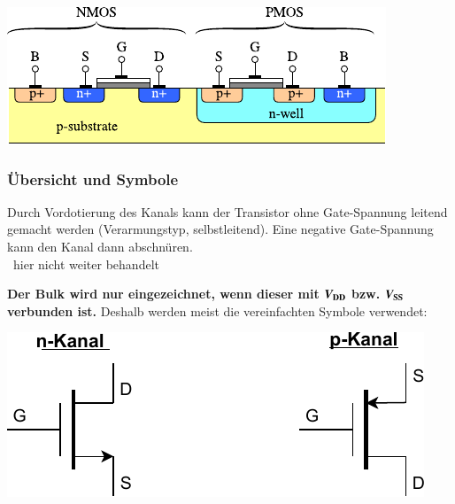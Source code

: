 \vspace{-0.2cm}

\begin{center}
    \includegraphics[width=0.5\columnwidth, align=t]{images/02_CMOS.pdf}
\end{center}


\subsubsection{Übersicht und Symbole}

\begin{minipage}[t]{0.48\columnwidth}
    Durch Vordotierung des Kanals kann der Transistor ohne Gate-Spannung leitend gemacht werden (Verarmungstyp, selbstleitend).
    Eine negative Gate-Spannung kann den Kanal dann abschnüren. \\
    \rightarrow\ hier nicht weiter behandelt

    \smallskip

    \textbf{Der Bulk wird nur eingezeichnet, wenn dieser  mit $\bm{V_{\rm DD}}$ bzw. $\bm{V_{\rm SS}}$ verbunden ist.}
    Deshalb werden meist die vereinfachten Symbole verwendet:

    \vspace{-0.3cm}

    \begin{center}
        \includegraphics[width=0.8\columnwidth, align=t]{images/02_MOSFET_symbole_vereinfacht.pdf}
    \end{center}
\end{minipage}
\hfill
